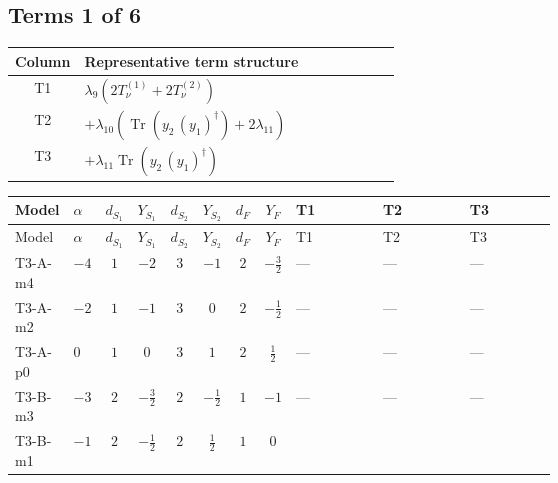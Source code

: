 \documentclass[8pt]{article}
\begin{document}
\begin{landscape}
\subsection*{Terms 1 of 6}
\begin{center}
\begin{tabular}{@{}c >{\raggedright\arraybackslash}p{0.82\linewidth}@{}}
\toprule
Column & Representative term structure \\
\midrule
T1 & \(\displaystyle {\lambda_{9}} (2 T_{\nu}^{(1)}+2 T_{\nu}^{(2)})\) \\
\midrule
T2 & \(\displaystyle +{\lambda_{10}} (\operatorname{Tr}\!\left({y_2}\,\left({y_1}\right)^{\dagger}\right)+2 {\lambda_{11}})\) \\
\midrule
T3 & \(\displaystyle +{\lambda_{11}} \operatorname{Tr}\!\left({y_2}\,\left({y_1}\right)^{\dagger}\right)\) \\
\midrule
\bottomrule
\end{tabular}
\end{center}
\smallskip
\tiny
\begin{longtable}{@{}llcccccc >{\raggedright\arraybackslash}p{0.21\linewidth} >{\raggedright\arraybackslash}p{0.21\linewidth} >{\raggedright\arraybackslash}p{0.21\linewidth}@{}}
\toprule
Model & $\alpha$ & $d_{S_1}$ & $Y_{S_1}$ & $d_{S_2}$ & $Y_{S_2}$ & $d_F$ & $Y_F$ & T1 & T2 & T3 \\
\midrule
\endfirsthead
\toprule
Model & $\alpha$ & $d_{S_1}$ & $Y_{S_1}$ & $d_{S_2}$ & $Y_{S_2}$ & $d_F$ & $Y_F$ & T1 & T2 & T3 \\
\midrule
\endhead
T3-A-m4 & $-4$ & $1$ & $-2$ & $3$ & $-1$ & $2$ & $-\frac{3}{2}$ & --- & --- & --- \\
\midrule
T3-A-m2 & $-2$ & $1$ & $-1$ & $3$ & $0$ & $2$ & $-\frac{1}{2}$ & --- & --- & --- \\
\midrule
T3-A-p0 & $0$ & $1$ & $0$ & $3$ & $1$ & $2$ & $\frac{1}{2}$ & --- & --- & --- \\
\midrule
T3-B-m3 & $-3$ & $2$ & $-\frac{3}{2}$ & $2$ & $-\frac{1}{2}$ & $1$ & $-1$ & --- & --- & --- \\
\midrule
T3-B-m1 & $-1$ & $2$ & $-\frac{1}{2}$ & $2$ & $\frac{1}{2}$ & $1$ & $0$ & \scriptsize\adjustbox{max width=\linewidth}{$\begin{gathered} {\lambda_{9}} (2 T_{\nu}^{(1)}+2 T_{\nu}^{(2)})\end{gathered}$} & \scriptsize\adjustbox{max width=\linewidth}{$\begin{gathered} +{\lambda_{10}} (\operatorname{Tr}\!\left({y_2}\,\left({y_1}\right)^{\dagger}\right)+2 {\lambda_{11}})\end{gathered}$} & \scriptsize\adjustbox{max width=\linewidth}{$\begin{gathered} +{\lambda_{11}} \operatorname{Tr}\!\left({y_2}\,\left({y_1}\right)^{\dagger}\right)\end{gathered}$} \\

\end{longtable}
\end{landscape}
\end{document}
